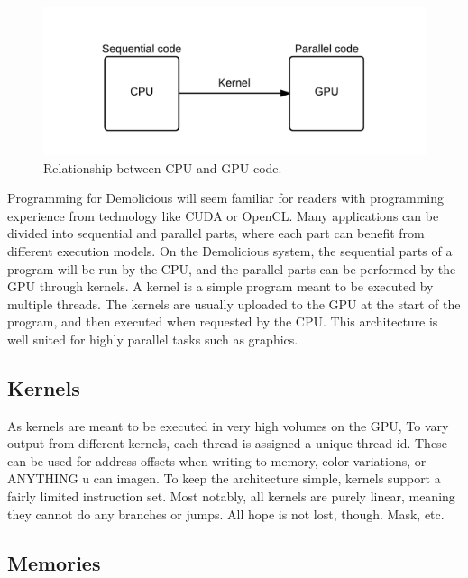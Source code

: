 \begin{figure}[H]
	\centering
	\includegraphics[width=\textwidth]{system_overview/diagrams/programming_model_cpu_gpu.png}
	\caption{Relationship between CPU and GPU code.}
	\label{fig:programming_model_cpu_gpu}
\end{figure}
Programming for Demolicious will seem familiar for readers with programming experience from technology like CUDA or OpenCL. 
Many applications can be divided into sequential and parallel parts, where each part can benefit from different execution models. 
On the Demolicious system, the sequential parts of a program will be run by the CPU, and the parallel parts can be performed by the GPU through kernels.
A kernel is a simple program meant to be executed by multiple threads.
The kernels are usually uploaded to the GPU at the start of the program, and then executed when requested by the CPU.
This architecture is well suited for highly parallel tasks such as graphics.

\subsection{Kernels}
As kernels are meant to be executed in very high volumes on the GPU, 
To vary output from different kernels, each thread is assigned a unique thread id.
These can be used for address offsets when writing to memory,
color variations, or ANYTHING u can imagen.
To keep the architecture simple, kernels support a fairly limited instruction set.
Most notably, all kernels are purely linear, meaning they cannot do any branches or jumps.
All hope is not lost, though. Mask, etc.

\subsection{Memories}

